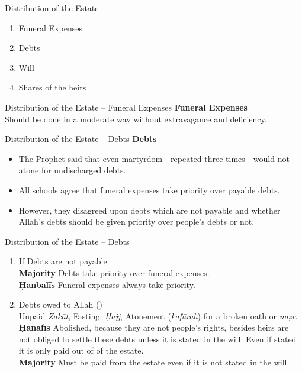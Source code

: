 \begin{frame}{Distribution of the Estate}
\begin{enumerate}
\item Funeral Expenses
\item Debts
\item Will
\item Shares of the heirs
\end{enumerate}
\end{frame}

\begin{frame}{Distribution of the Estate -- Funeral Expenses}
\textbf{Funeral Expenses}\\
Should be done in a moderate way without extravagance and deficiency.
\end{frame}

\begin{frame}{Distribution of the Estate -- Debts}
\textbf{Debts}\\
\begin{itemize}
\item The Prophet \pbuh said that even martyrdom---repeated three times---would not atone for undischarged debts.
\item All schools agree that funeral expenses take priority over payable debts.
\item However, they disagreed upon debts which are not payable and whether Allah’s debts should be given priority over people’s debts or not.
\end{itemize}
\end{frame}

\begin{frame}{Distribution of the Estate -- Debts}
\begin{enumerate}[A]
\item If Debts are not payable\\
\textbf{Majority} Debts take priority over funeral expenses.\\
\textbf{Ḥanbalīs} Funeral expenses always take priority.
\item Debts owed to Allah ()\\
Unpaid \textit{Zakāt}, Fasting, \textit{Ḥajj}, Atonement (\textit{kafārah}) for a broken oath or \textit{naẓr}.\\
\textbf{Ḥanafīs} Abolished, because they are not people’s rights, besides heirs are not obliged to settle these  debts unless it is stated in the will. Even if stated it is only paid out of  of the estate.\\
\textbf{Majority} Must be paid from the estate even if it is not stated in the will.
\end{enumerate}
\end{frame}

